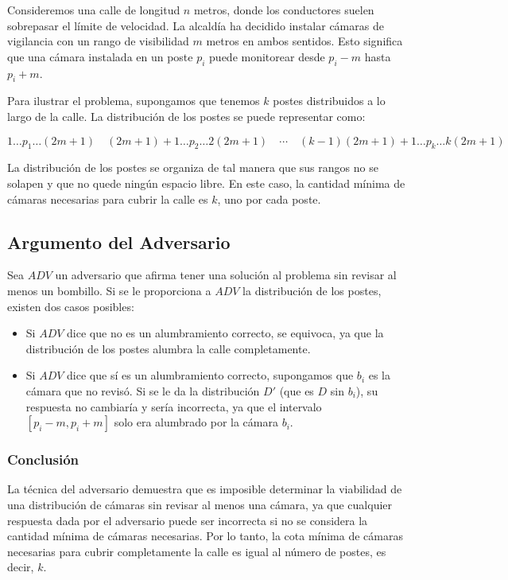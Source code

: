 \documentclass{article}
\begin{document}
Consideremos una calle de longitud \( n \) metros, donde los conductores suelen sobrepasar el límite de velocidad. La alcaldía ha decidido instalar cámaras de vigilancia con un rango de visibilidad \( m \) metros en ambos sentidos. Esto significa que una cámara instalada en un poste \( p_i \) puede monitorear desde \( p_i - m \) hasta \( p_i + m \).

Para ilustrar el problema, supongamos que tenemos \( k \) postes distribuidos a lo largo de la calle. La distribución de los postes se puede representar como:

$$
1 \ldots p_1 \ldots (2m + 1) \quad (2m + 1) + 1 \ldots p_2 \ldots 2(2m + 1) \quad \cdots \quad (k - 1)(2m + 1) + 1 \ldots p_k \ldots k(2m + 1)
$$


La distribución de los postes se organiza de tal manera que sus rangos no se solapen y que no quede ningún espacio libre. En este caso, la cantidad mínima de cámaras necesarias para cubrir la calle es \( k \), uno por cada poste.

\subsection{Argumento del Adversario}

Sea \( ADV \) un adversario que afirma tener una solución al problema sin revisar al menos un bombillo. Si se le proporciona a \( ADV \) la distribución de los postes, existen dos casos posibles:

\begin{itemize}
    \item Si \( ADV \) dice que no es un alumbramiento correcto, se equivoca, ya que la distribución de los postes alumbra la calle completamente.
    \item Si \( ADV \) dice que sí es un alumbramiento correcto, supongamos que \( b_i \) es la cámara que no revisó. Si se le da la distribución \( D' \) (que es \( D \) sin \( b_i \)), su respuesta no cambiaría y sería incorrecta, ya que el intervalo \([p_i - m, p_i + m]\) solo era alumbrado por la cámara \( b_i \).
\end{itemize}

\subsubsection{Conclusión}

La técnica del adversario demuestra que es imposible determinar la viabilidad de una distribución de cámaras sin revisar al menos una cámara, ya que cualquier respuesta dada por el adversario puede ser incorrecta si no se considera la cantidad mínima de cámaras necesarias. Por lo tanto, la cota mínima de cámaras necesarias para cubrir completamente la calle es igual al número de postes, es decir, \( k \).
\end{document}
